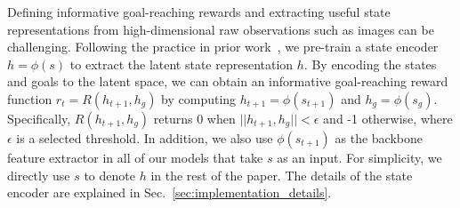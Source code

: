 Defining informative goal-reaching rewards and extracting useful state representations from high-dimensional raw observations such as images can be challenging. Following the practice in prior work~\citep{nair2018rig, Khazatsky2021WhatCI}, we pre-train a state encoder $h=\phi(s)$ to extract the latent state representation $h$. By encoding the states and goals to the latent space, we can obtain an informative goal-reaching reward function $r_t = R(h_{t+1}, h_g)$ by computing $h_{t+1} = \phi(s_{t+1})$ and $h_g = \phi(s_g)$. Specifically, $R(h_{t+1}, h_g)$ returns 0 when $||h_{t+1}, h_g || < \epsilon$ and -1 otherwise, where $\epsilon$ is a selected threshold. In addition, we also use $\phi(s_{t+1})$ as the backbone feature extractor in all of our models that take $s$ as an input. For simplicity, we directly use $s$ to denote $h$ in the rest of the paper. The details of the state encoder are explained in Sec.~\ref{sec:implementation_details}.




